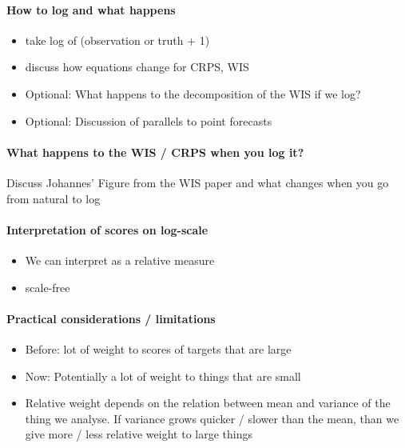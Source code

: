\documentclass{article}
\begin{document}
\paragraph{How to log and what happens}
\begin{itemize}
    \item take log of (observation or truth + 1) 
    \item discuss how equations change for CRPS, WIS
    \item Optional: What happens to the decomposition of the WIS if we log?
    \item Optional: Discussion of parallels to point forecasts \\
\end{itemize}


\paragraph{What happens to the WIS / CRPS when you log it?}
Discuss Johannes' Figure from the WIS paper and what changes when you go from natural to log \\

\paragraph{Interpretation of scores on log-scale}

\begin{itemize}
    \item We can interpret as a relative measure
    \item scale-free
\end{itemize}

\paragraph{Practical considerations / limitations}

\begin{itemize}
    \item Before: lot of weight to scores of targets that are large
    \item Now: Potentially a lot of weight to things that are small
    \item Relative weight depends on the relation between mean and variance of the thing we analyse. If variance grows quicker / slower than the mean, than we give more / less relative weight to large things
\end{itemize}
\end{document}

